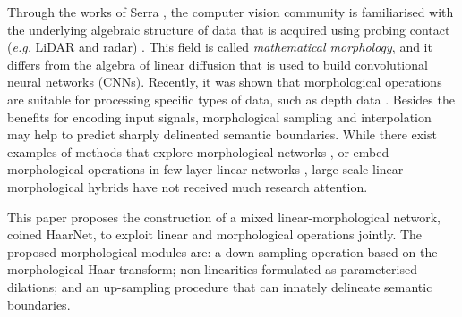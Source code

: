 \documentclass{article}
\def\eg{\emph{e.g. }}
\begin{document}
Through the works of Serra \cite{serra1982image}, the computer vision community is familiarised with the underlying algebraic structure of data that is acquired using probing contact (\eg LiDAR and radar) \cite{ritter1996introduction,sussner1998morphological,serra1992overview}.
This field is called \emph{mathematical morphology}, and it differs from the algebra of linear diffusion that is used to build convolutional neural networks (CNNs).
Recently, it was shown that morphological operations are suitable for processing specific types of data, such as depth data \cite{groenendijk2022morphpool}.
Besides the benefits for encoding input signals, morphological sampling and interpolation may help to predict sharply delineated semantic boundaries.
While there exist examples of methods that explore morphological networks \cite{mondal2022morphological}, or embed morphological operations in few-layer linear networks \cite{shen2019deep,franchi2020deep,dimitriadis2020advances,hernandez2020hybrid,roy2021morphological,velasco-forero2022fixed}, large-scale linear-morphological hybrids have not received much research attention.

This paper proposes the construction of a mixed linear-morphological network, coined HaarNet, to exploit linear and morphological operations jointly. 
The proposed morphological modules are: a down-sampling operation based on the morphological Haar transform; non-linearities formulated as parameterised dilations; and an up-sampling procedure that can innately delineate semantic boundaries. 
\end{document}
